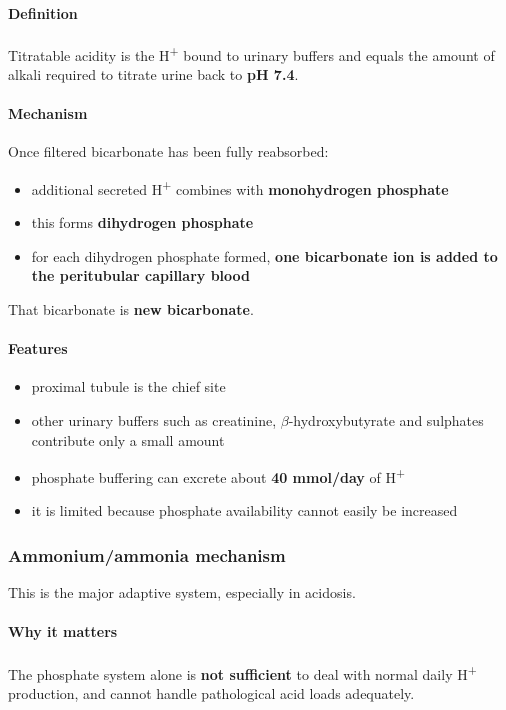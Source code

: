 \documentclass[11pt,a4paper]{article}
\begin{document}
\paragraph{Definition}
Titratable acidity is the H\textsuperscript{+} bound to urinary buffers and equals the amount of alkali required to titrate urine back to \textbf{pH 7.4}.

\paragraph{Mechanism}
Once filtered bicarbonate has been fully reabsorbed:
\begin{itemize}
  \item additional secreted H\textsuperscript{+} combines with \textbf{monohydrogen phosphate}
  \item this forms \textbf{dihydrogen phosphate}
  \item for each dihydrogen phosphate formed, \textbf{one bicarbonate ion is added to the peritubular capillary blood}
\end{itemize}

That bicarbonate is \textbf{new bicarbonate}.

\paragraph{Features}
\begin{itemize}
  \item proximal tubule is the chief site
  \item other urinary buffers such as creatinine, $\beta$-hydroxybutyrate and sulphates contribute only a small amount
  \item phosphate buffering can excrete about \textbf{40 mmol/day} of H\textsuperscript{+}
  \item it is limited because phosphate availability cannot easily be increased
\end{itemize}

\subsubsection{Ammonium/ammonia mechanism}

This is the major adaptive system, especially in acidosis.

\paragraph{Why it matters}
The phosphate system alone is \textbf{not sufficient} to deal with normal daily H\textsuperscript{+} production, and cannot handle pathological acid loads adequately.
\end{document}
